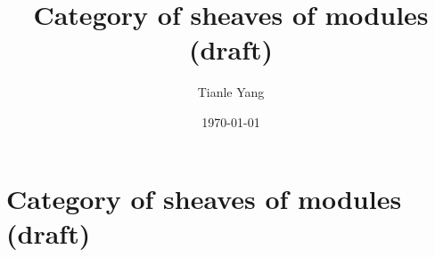 \documentclass{noteformyself}
\title{Category of sheaves of modules (draft)}
\author{Tianle Yang}
\date{\today}
\begin{document}
    \maketitle

    \section{Category of sheaves of modules (draft)}


\end{document}

